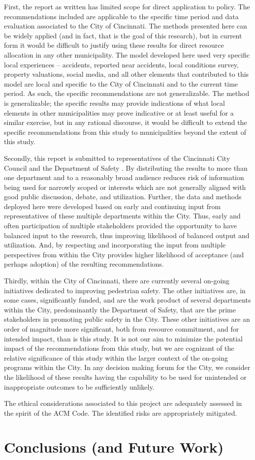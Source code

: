 \documentclass{llncs}
\begin{document}
First, the report as written has limited scope for direct application to policy. The recommendations included are applicable to the specific time period and data evaluation associated to the City of Cincinnati. The methods presented here can be widely applied (and in fact, that is the goal of this research), but in current form it would be difficult to justify using these results for direct resource allocation in any other municipality. The model developed here used very specific local experiences – accidents, reported near accidents, local conditions survey, property valuations, social media, and all other elements that contributed to this model are local and specific to the City of Cincinnati and to the current time period. As such, the specific recommendations are not generalizable. The method is generalizable; the specific results may provide indications of what local elements in other municipalities may prove indicative or at least useful for a similar exercise, but in any rational discourse, it would be difficult to extend the specific recommendations from this study to municipalities beyond the extent of this study.

Secondly, this report is submitted to representatives of the Cincinnati City Council and the Department of Safety . By distributing the results to more than one department and to a reasonably broad audience reduces risk of information being used for narrowly scoped  or interests which are not generally aligned with good public discussion, debate, and utilization. Further, the data and methods deployed here were developed based on early and continuing input from representatives of these multiple departments within the City. Thus, early and often participation of multiple stakeholders provided the opportunity to have balanced input to the research, thus improving likelihood of balanced output and utilization. And, by respecting and incorporating the input from multiple perspectives from within the City provides higher likelihood of acceptance (and perhaps adoption) of the resulting recommendations.

Thirdly, within the City of Cincinnati, there are currently several on-going initiatives dedicated to improving pedestrian safety. The other initiatives are, in some cases, significantly funded, and are the work product of several departments within the City, predominantly the Department of Safety, that are the prime stakeholders in promoting public safety in the City. These other initiatives are an order of magnitude more significant, both from resource commitment, and for intended impact, than is this study. It is not our aim to minimize the potential impact of the recommendations from this study, but we are cognizant of the relative significance of this study within the larger context of the on-going programs within the City. In any decision making forum for the City, we consider the likelihood of these results having the capability to be used for unintended or inappropriate outcomes to be sufficiently unlikely.

The ethical considerations associated to this project are adequately assessed in the spirit of the ACM Code. The identified risks are appropriately mitigated.
%
\section{Conclusions (and Future Work)}
%
%


\end{document}
